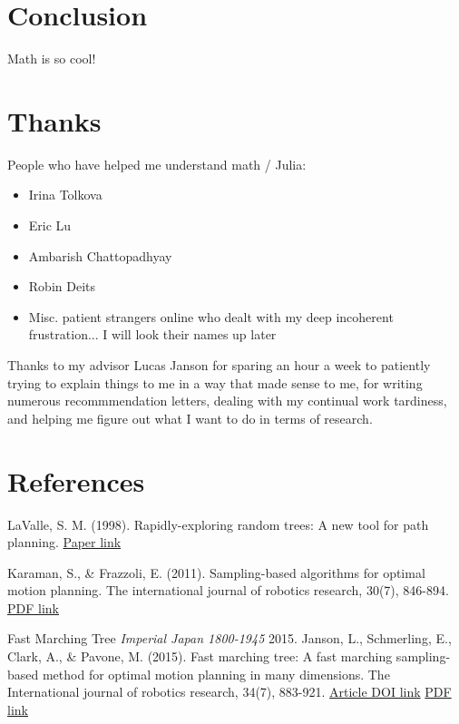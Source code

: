 \documentclass[a4paper]{article}
\begin{document}
\section{Conclusion}

Math is so cool!

\section{Thanks}

People who have helped me understand math / Julia:

\begin{itemize}
    \item Irina Tolkova
    \item Eric Lu 
    \item Ambarish Chattopadhyay
    \item Robin Deits
    \item Misc. patient strangers online who dealt with my deep incoherent
        frustration... I will look their names up later 
\end{itemize}

Thanks to my advisor Lucas Janson for sparing an hour a week to patiently trying
to explain things to me in a way that made sense to me, for writing
numerous recommmendation letters, dealing with my continual work tardiness, and
helping me figure out what I want to do in terms of research.


\section{References}

\begin{thebibliography}{1}

        LaValle, S. M. (1998). Rapidly-exploring random trees: A new tool for
        path planning.
        \href{http://bloom.personalrobotics.ri.cmu.edu/files/courses/papers/Kavraki98-prm.pdf}{Paper link} 

        Karaman, S., & Frazzoli, E. (2011). Sampling-based algorithms for
        optimal motion planning. The international journal of robotics research,
        30(7), 846-894.
        \href{https://arxiv.org/pdf/1105.1186}{PDF link}


 Fast Marching Tree {\em Imperial Japan 1800-1945} 2015.
    Janson, L., Schmerling, E., Clark, A., & Pavone, M. (2015). Fast marching
        tree: A fast marching sampling-based method for optimal motion planning
        in many dimensions. The International journal of robotics research,
        34(7), 883-921.
        \href{http://journals.sagepub.com/doi/10.1177/0278364915577958}{Article
        DOI link} 
        \href{ https://arxiv.org/pdf/1306.3532.pdf}{PDF link}


\end{thebibliography}






\end{document}
